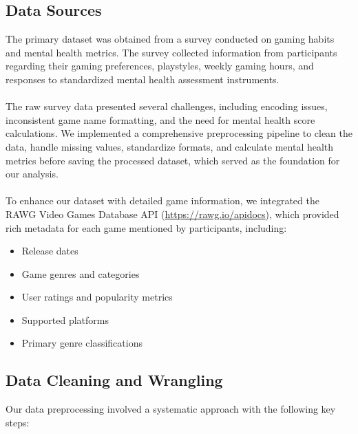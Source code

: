 \documentclass[12pt]{article}
\begin{document}
\subsection{Data Sources}

The primary dataset was obtained from a survey conducted on gaming habits and mental health metrics. The survey collected information from participants regarding their gaming preferences, playstyles, weekly gaming hours, and responses to standardized mental health assessment instruments.\\
\\
The raw survey data presented several challenges, including encoding issues, inconsistent game name formatting, and the need for mental health score calculations. We implemented a comprehensive preprocessing pipeline to clean the data, handle missing values, standardize formats, and calculate mental health metrics before saving the processed dataset, which served as the foundation for our analysis.\\
\\
To enhance our dataset with detailed game information, we integrated the RAWG Video Games Database API (\url{https://rawg.io/apidocs}), which provided rich metadata for each game mentioned by participants, including:
\begin{itemize}
    \item Release dates
    \item Game genres and categories
    \item User ratings and popularity metrics
    \item Supported platforms
    \item Primary genre classifications
\end{itemize}

\subsection{Data Cleaning and Wrangling}

Our data preprocessing involved a systematic approach with the following key steps:
\end{document}
